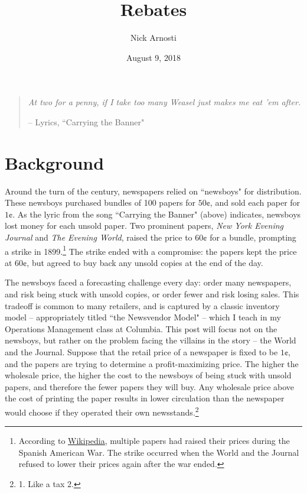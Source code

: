 \documentclass[11pt, oneside]{article}   	%
\title{\vspace{-.3 in} Rebates}
\author{Nick Arnosti}
\date{August 9, 2018}							%
\newcommand{\link}[2]{{\color{blue} \href{#1}{\underline{#2}}}}
\begin{document}
\maketitle

\begin{quote}
{\em At two for a penny, if I take too many Weasel just makes me eat 'em after.} \\ \centerline{ -- Lyrics, ``Carrying the Banner"}
\end{quote}

\section{Background}

Around the turn of the century, newspapers relied on ``newsboys" for distribution. These newsboys purchased bundles of 100 papers for $50\cent$, and sold each paper for $1\cent$. As the lyric from the song ``Carrying the Banner" (above) indicates, newsboys lost money for each unsold paper. Two prominent papers, {\em New York Evening Journal} and {\em The Evening World}, raised the price to $60\cent$ for a bundle, prompting a strike in 1899.\footnote{According to \link{https://en.wikipedia.org/wiki/Newsboys\%27_strike_of_1899}{Wikipedia}, multiple papers had raised their prices during the Spanish American War. The strike occurred when the World and the Journal refused to lower their prices again after the war ended.} The strike ended with a compromise: the papers kept the price at $60\cent$, but agreed to buy back any unsold copies at the end of the day.

The newsboys faced a forecasting challenge every day: order many newspapers, and risk being stuck with unsold copies, or order fewer and risk losing sales. This tradeoff is common to many retailers, and is captured by a classic inventory model -- appropriately titled ``the Newsvendor Model" -- which I teach in my Operations Management class at Columbia. This post will focus not on the newsboys, but rather on the problem facing the villains in the story -- the World and the Journal. Suppose that the retail price of a newspaper is fixed to be $1\cent$, and the papers are trying to determine a profit-maximizing price. The higher the wholesale price, the higher the cost to the newsboys of being stuck with unsold papers, and therefore the fewer papers they will buy. Any wholesale price above the cost of printing the paper results in lower circulation than the newspaper would choose if they operated their own newsstands.\footnote{1. Like a tax 2. }
\end{document}
